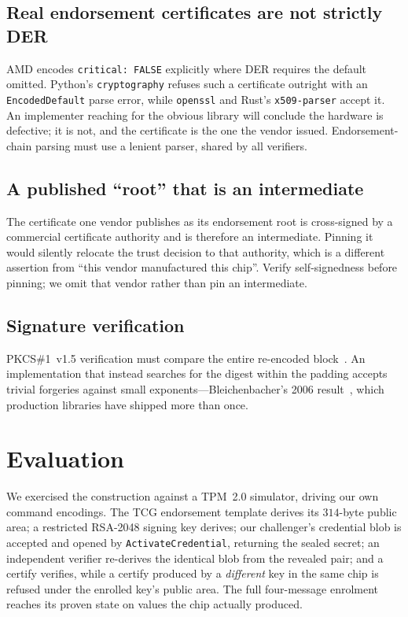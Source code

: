 \documentclass[conference,10pt]{IEEEtran}
\begin{document}
\subsection{Real endorsement certificates are not strictly DER}

AMD encodes \texttt{critical: FALSE} explicitly where DER requires the default omitted. Python's
\texttt{cryptography} refuses such a certificate outright with an \texttt{EncodedDefault} parse error,
while \texttt{openssl} and Rust's \texttt{x509-parser} accept it. An implementer reaching for the
obvious library will conclude the hardware is defective; it is not, and the certificate is the one the
vendor issued. Endorsement-chain parsing must use a lenient parser, shared by all verifiers.

\subsection{A published ``root'' that is an intermediate}

The certificate one vendor publishes as its endorsement root is cross-signed by a commercial
certificate authority and is therefore an intermediate. Pinning it would silently relocate the trust
decision to that authority, which is a different assertion from ``this vendor manufactured this chip''.
Verify self-signedness before pinning; we omit that vendor rather than pin an intermediate.

\subsection{Signature verification}

PKCS\#1~v1.5 verification must compare the entire re-encoded block~\cite{rfc8017}. An implementation
that instead searches for the digest within the padding accepts trivial forgeries against small
exponents---Bleichenbacher's 2006 result~\cite{finney,cve2006}, which production libraries have shipped
more than once.

\section{Evaluation}
\label{sec:eval}

We exercised the construction against a TPM~2.0 simulator, driving our own command encodings. The TCG
endorsement template derives its $314$-byte public area; a restricted RSA-2048 signing key derives; our
challenger's credential blob is accepted and opened by \texttt{ActivateCredential}, returning the sealed
secret; an independent verifier re-derives the identical blob from the revealed pair; and a certify
verifies, while a certify produced by a \emph{different} key in the same chip is refused under the
enrolled key's public area. The full four-message enrolment reaches its proven state on values the chip
actually produced.
\end{document}
